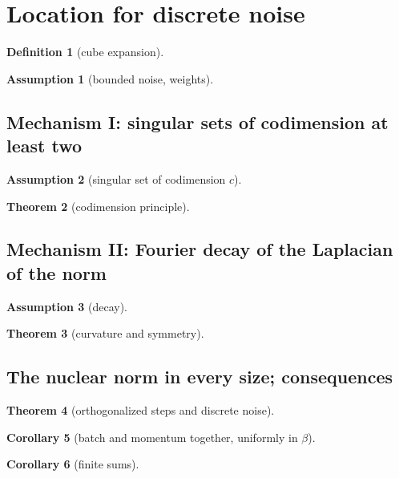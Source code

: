 \documentclass[10pt]{article}
\newtheorem{theorem}{Theorem}
\newtheorem{corollary}[theorem]{Corollary}
\theoremstyle{definition}
\newtheorem{definition}[theorem]{Definition}
\newtheorem{assumption}{Assumption}
\theoremstyle{remark}
\begin{document}
\section{Location for discrete noise}\label{sec:discrete}

\begin{definition}[cube expansion]\label{def:class}\StmtClass\end{definition}
\begin{assumption}[bounded noise, weights]\label{ass:B}\StmtAssB\end{assumption}


\subsection{Mechanism I: singular sets of codimension at least two}
\begin{assumption}[singular set of codimension $c$]\label{ass:R}\StmtAssR\end{assumption}
\begin{theorem}[codimension principle]\label{thm:codim}\StmtCodim\end{theorem}


\subsection{Mechanism II: Fourier decay of the Laplacian of the norm}
\begin{assumption}[decay]\label{ass:L}\StmtAssL\end{assumption}
\begin{theorem}[curvature and symmetry]\label{thm:laplace}\StmtLaplace\end{theorem}


\subsection{The nuclear norm in every size; consequences}
\begin{theorem}[orthogonalized steps and discrete noise]\label{thm:nuclear}\StmtNuclear\end{theorem}
\begin{corollary}[batch and momentum together, uniformly in $\beta$]\label{cor:mom}\StmtMomCor\end{corollary}
\begin{corollary}[finite sums]\label{cor:fs}\StmtFS\end{corollary}

\end{document}
